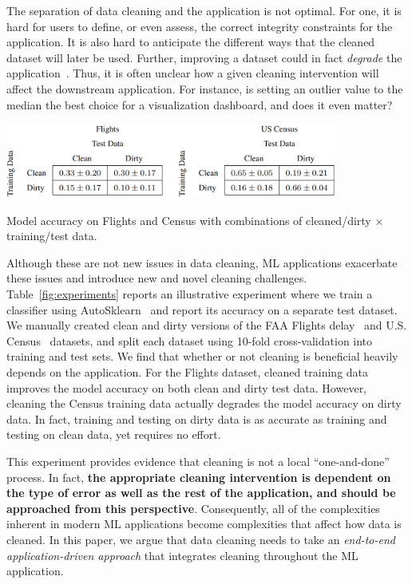 \documentclass[11pt,dvipsnames]{article}
\begin{document}
The separation of data cleaning and the application is not optimal. For one, it is hard for users to define, or even assess, the correct integrity constraints for the application. It is also hard to anticipate the different ways that the cleaned dataset will later be used. Further, improving a dataset could in fact {\it degrade} the application~\cite{SoftwareEngineering4ML}.   Thus, it is often unclear how a given cleaning intervention will affect the downstream application. For instance, is setting an outlier value to the median the best choice for a visualization dashboard, and does it even matter?    


%

\begin{table}[!t]
  \centering
  \includegraphics[width=10.9cm]{submissions/cleaning-for-ml/images/autoML.png}
  \caption{Model accuracy on Flights and Census with combinations of cleaned/dirty $\times$ training/test data.}\label{fig:experiments}
\end{table}

Although these are not new issues in data cleaning, ML applications exacerbate these issues and introduce new and novel cleaning challenges. Table~\ref{fig:experiments} reports an illustrative experiment where we train a classifier using AutoSklearn~\cite{AutoSklearn} and report its accuracy on a separate test dataset.  We manually created clean and dirty versions of the FAA Flights delay~\cite{Baran} and U.S. Census~\cite{CleanML} datasets, and split each dataset using 10-fold cross-validation into training and test sets.  We find that whether or not cleaning is beneficial heavily depends on the application. For the Flights dataset, cleaned training data improves the model accuracy on both clean and dirty test data.  However, cleaning the Census training data actually degrades the model accuracy on dirty data.  In fact, training and testing on dirty data is as accurate as training and testing on clean data, yet requires no effort.    

This experiment provides evidence that cleaning is not a local ``one-and-done'' process.  In fact, \textbf{the appropriate cleaning intervention is dependent on the type of error as well as the rest of the application, and should be approached from this perspective}.    
Consequently, all of the complexities inherent in modern ML applications become complexities that affect how data is cleaned.   In this paper, we argue that data cleaning needs to take an \emph{end-to-end application-driven approach } that integrates cleaning throughout the ML application. 
\end{document}
